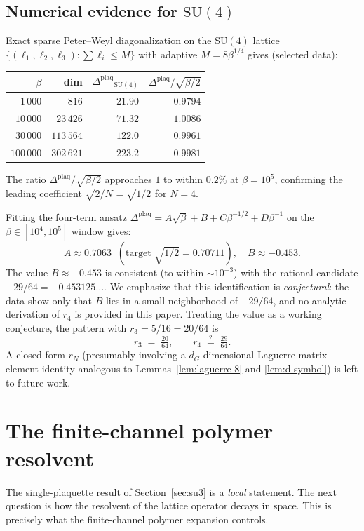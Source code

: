 \documentclass[11pt,a4paper]{article}
\theoremstyle{definition}
\newcommand{\SU}{\mathrm{SU}}
\newcommand{\Gap}{{\Delta^{\mathrm{plaq}}}}
\begin{document}
\subsection{Numerical evidence for $\SU(4)$}

Exact sparse Peter--Weyl diagonalization on the $\SU(4)$ lattice
$\{(\ell_1,\ell_2,\ell_3): \sum\ell_i \le M\}$ with adaptive
$M = 8\beta^{1/4}$ gives (selected data):
\begin{center}
\begin{tabular}{rrrr}
\toprule
$\beta$ & dim & $\Gap_{\SU(4)}$ & $\Gap/\sqrt{\beta/2}$ \\
\midrule
$1\,000$ & $816$ & $21.90$ & $0.9794$ \\
$10\,000$ & $23\,426$ & $71.32$ & $1.0086$ \\
$30\,000$ & $113\,564$ & $122.0$ & $0.9961$ \\
$100\,000$ & $302\,621$ & $223.2$ & $0.9981$ \\
\bottomrule
\end{tabular}
\end{center}
The ratio $\Gap/\sqrt{\beta/2}$ approaches $1$ to within $0.2\%$ at
$\beta=10^5$, confirming the leading coefficient $\sqrt{2/N} =
\sqrt{1/2}$ for $N=4$.

Fitting the four-term ansatz
$\Gap = A\sqrt\beta + B + C\beta^{-1/2} + D\beta^{-1}$ on the
$\beta\in[10^4, 10^5]$ window gives:
\[
A \approx 0.7063 \;\;(\text{target } \sqrt{1/2} = 0.70711),
\quad
B \approx -0.453.
\]
The value $B \approx -0.453$ is consistent (to within $\sim 10^{-3}$)
with the rational candidate $-29/64 = -0.453125\ldots$. We emphasize
that this identification is \emph{conjectural}: the data show only
that $B$ lies in a small neighborhood of $-29/64$, and no analytic
derivation of $r_4$ is provided in this paper. Treating the value as
a working conjecture, the pattern with $r_3 = 5/16 = 20/64$ is
\[
r_3 \;=\; \tfrac{20}{64}, \qquad r_4 \;\stackrel{?}{=}\; \tfrac{29}{64}.
\]
A closed-form $r_N$ (presumably involving a $d_G$-dimensional Laguerre
matrix-element identity analogous to Lemmas~\ref{lem:laguerre-8} and
\ref{lem:d-symbol}) is left to future work.

\section{The finite-channel polymer resolvent}\label{sec:channel}

The single-plaquette result of Section~\ref{sec:su3} is a
\emph{local} statement. The next question is how the resolvent of
the lattice operator decays in space. This is precisely what the
finite-channel polymer expansion controls.
\end{document}

